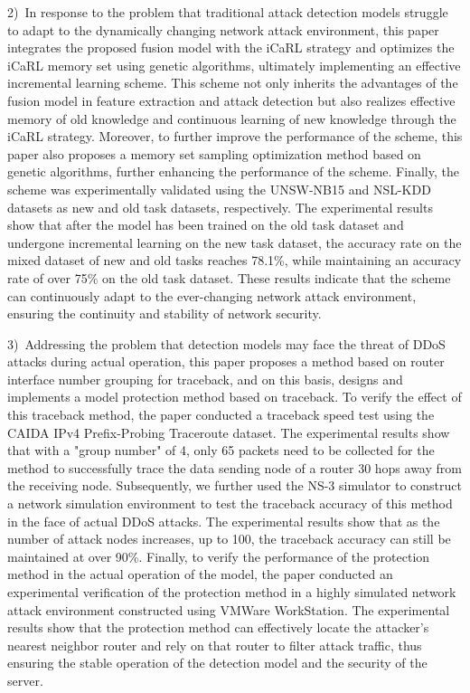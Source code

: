 \begin{eabstract}
    2)~In response to the problem that traditional attack detection models struggle to adapt to the dynamically changing network attack environment, this paper integrates the proposed fusion model with the iCaRL strategy and optimizes the iCaRL memory set using genetic algorithms, ultimately implementing an effective incremental learning scheme. This scheme not only inherits the advantages of the fusion model in feature extraction and attack detection but also realizes effective memory of old knowledge and continuous learning of new knowledge through the iCaRL strategy. Moreover, to further improve the performance of the scheme, this paper also proposes a memory set sampling optimization method based on genetic algorithms, further enhancing the performance of the scheme. Finally, the scheme was experimentally validated using the UNSW-NB15 and NSL-KDD datasets as new and old task datasets, respectively. The experimental results show that after the model has been trained on the old task dataset and undergone incremental learning on the new task dataset, the accuracy rate on the mixed dataset of new and old tasks reaches 78.1\%, while maintaining an accuracy rate of over 75\% on the old task dataset. These results indicate that the scheme can continuously adapt to the ever-changing network attack environment, ensuring the continuity and stability of network security.
    
    3)~Addressing the problem that detection models may face the threat of DDoS attacks during actual operation, this paper proposes a method based on router interface number grouping for traceback, and on this basis, designs and implements a model protection method based on traceback. To verify the effect of this traceback method, the paper conducted a traceback speed test using the CAIDA IPv4 Prefix-Probing Traceroute dataset. The experimental results show that with a "group number" of 4, only 65 packets need to be collected for the method to successfully trace the data sending node of a router 30 hops away from the receiving node. Subsequently, we further used the NS-3 simulator to construct a network simulation environment to test the traceback accuracy of this method in the face of actual DDoS attacks. The experimental results show that as the number of attack nodes increases, up to 100, the traceback accuracy can still be maintained at over 90\%. Finally, to verify the performance of the protection method in the actual operation of the model, the paper conducted an experimental verification of the protection method in a highly simulated network attack environment constructed using VMWare WorkStation. The experimental results show that the protection method can effectively locate the attacker's nearest neighbor router and rely on that router to filter attack traffic, thus ensuring the stable operation of the detection model and the security of the server.
\end{eabstract}

